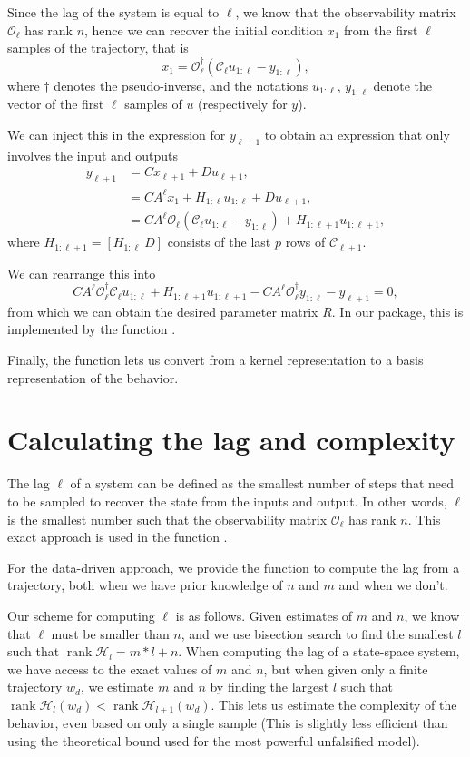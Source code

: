 \documentclass[11pt]{article}
\def\rank{\operatorname{rank}}
\begin{document}
Since the lag of the system is equal to $\ell$, we know that the observability matrix $\mathscr{O}_\ell$ has rank $n$, hence we can recover the initial condition $x_1$ from the first $\ell$ samples of the trajectory, that is
$$ x_1 = \mathscr{O}_\ell^\dagger (\mathscr{C}_\ell u_{1:\ell} - y_{1:\ell}), $$
where $\dagger$ denotes the pseudo-inverse, and the notations $u_{1:\ell}$, $y_{1:\ell}$ denote the vector of the first $\ell$ samples of $u$ (respectively for $y$). 

We can inject this in the expression for $y_{\ell+1}$ to obtain an expression that only involves the input and outputs
\begin{align*}
  y_{\ell+1} &= Cx_{\ell+1} + Du_{\ell+1}, \\
   &= CA^\ell x_1 + H_{1:\ell} u_{1:\ell} + Du_{\ell+1}, \\
   &= CA^\ell \mathscr{O}_\ell (\mathscr{C}_\ell u_{1:\ell} - y_{1:\ell}) + H_{1:\ell+1} u_{1:\ell+1},
\end{align*}
where $H_{1:\ell+1} = [H_{1:\ell} ~D]$ consists of the last $p$ rows of $\mathscr{C}_{\ell+1}$.

We can rearrange this into 
$$ CA^\ell \mathscr{O}_\ell^\dagger \mathscr{C}_\ell u_{1:\ell} + H_{1:\ell+1} u_{1:\ell+1} - CA^\ell \mathscr{O}_\ell^\dagger y_{1:\ell} -y_{\ell+1} = 0,$$
from which we can obtain the desired parameter matrix $R$. In our package, this is implemented by the function .

Finally, the function  lets us convert from a kernel representation to a basis representation of the behavior.

\section{Calculating the lag and complexity}
The lag $\ell$ of a system can be defined as the smallest number of steps that need to be sampled to recover the state from the inputs and output. In other words, $\ell$ is the smallest number such that the observability matrix $\mathscr{O}_\ell$ has rank $n$. This exact approach is used in the function .

For the data-driven approach, we provide the function  to compute the lag from a trajectory, both when we have prior knowledge of $n$ and $m$ and when we don't.

Our scheme for computing $\ell$ is as follows. Given estimates of $m$ and $n$, we know that $\ell$ must be smaller than $n$, and we use bisection search to find the smallest $l$ such that $\rank \mathscr{H}_{l} = m*l + n$. When computing the lag of a state-space system, we have access to the exact values of $m$ and $n$, but when given only a finite trajectory $w_d$, we estimate $m$ and $n$ by finding the largest $l$ such that $\rank \mathscr{H}_l (w_d) < \rank \mathscr{H}_{l+1}(w_d)$. This lets us estimate the complexity of the behavior, even based on only a single sample (This is slightly less efficient than using the theoretical bound used for the most powerful unfalsified model).
\end{document}
